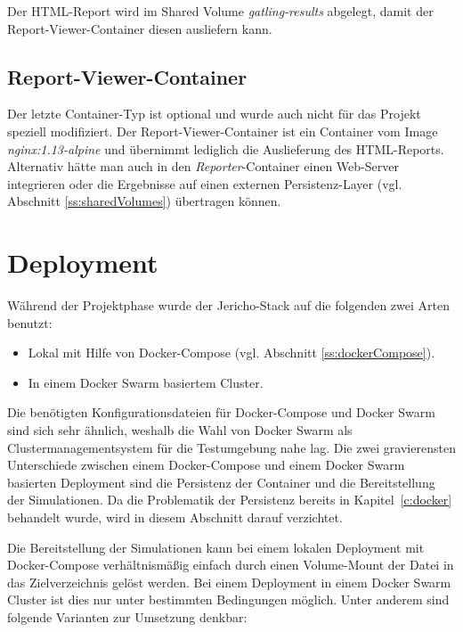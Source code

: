 Der HTML-Report wird im Shared Volume \textit{gatling-results} abgelegt, damit der Report-Viewer-Container diesen ausliefern kann.

\subsection{Report-Viewer-Container}

Der letzte Container-Typ ist optional und wurde auch nicht f\"ur das Projekt speziell modifiziert.
Der Report-Viewer-Container ist ein Container vom Image \textit{nginx:1.13-alpine} und \"ubernimmt lediglich die Auslieferung des HTML-Reports.
Alternativ h\"atte man auch in den \textit{Reporter}-Container einen Web-Server integrieren oder die Ergebnisse auf einen externen Persistenz-Layer (vgl. Abschnitt \ref{ss:sharedVolumes}) \"ubertragen k\"onnen.

\section{Deployment}

W\"ahrend der Projektphase wurde der \glqq{}Jericho-Stack\grqq{} auf die folgenden zwei Arten benutzt:

\begin{itemize}
	\item Lokal mit Hilfe von Docker-Compose (vgl. Abschnitt \ref{ss:dockerCompose}).
	\item In einem Docker Swarm basiertem Cluster.
\end{itemize}

Die ben\"otigten Konfigurationsdateien f\"ur Docker-Compose und Docker Swarm sind sich sehr \"ahnlich, weshalb die Wahl von Docker Swarm als Clustermanagementsystem f\"ur die Testumgebung nahe lag.
Die zwei gravierensten Unterschiede zwischen einem Docker-Compose und einem Docker Swarm basierten Deployment sind die Persistenz der Container und die Bereitstellung der Simulationen.
Da die Problematik der Persistenz bereits in Kapitel~\ref{c:docker} behandelt wurde, wird in diesem Abschnitt darauf verzichtet.

Die Bereitstellung der Simulationen kann bei einem lokalen Deployment mit Docker-Compose verh\"altnism\"a\ss{}ig einfach durch einen Volume-Mount der Datei in das Zielverzeichnis gel\"ost werden.
Bei einem Deployment in einem Docker Swarm Cluster ist dies nur unter bestimmten Bedingungen m\"oglich.
Unter anderem sind folgende Varianten zur Umsetzung denkbar:

